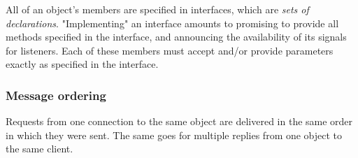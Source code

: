 \documentclass{myproc}
\begin{document}
All of an object's members are specified in interfaces, which are {\em  sets
  of declarations\/}. "Implementing" an 
interface amounts to promising to provide all methods specified in the
interface, and announcing the availability of its signals for listeners. Each
of these members must accept and/or provide parameters exactly as specified in
the interface.  





\subsubsection{Message ordering}
Requests from one connection to the same object are delivered in the same order in which they were sent. The same goes for multiple replies from one object to the same client.
\end{document}

